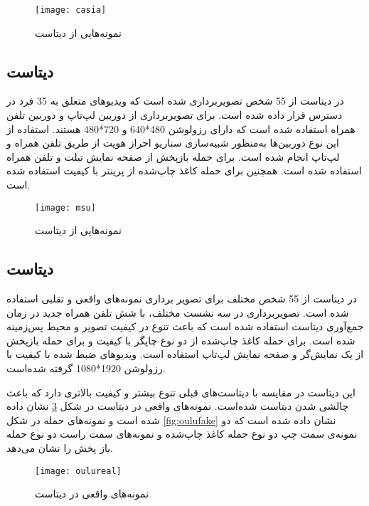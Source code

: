  \begin{figure}[h]
	\centerline{\texttt{[image: casia]}}
	\caption{نمونه‌هایی از دیتاست  \cite{zhang2012face} }
	\label{fig:casia}
\end{figure}

\subsection{دیتاست }
در دیتاست 
\cite{wen2015face}
 از 55 شخص تصویربرداری شده است که ویدیوهای متعلق به 35 فرد در دسترس قرار داده شده است. برای تصویربرداری از دوربین لپ‌تاپ و دوربین تلفن همراه استفاده شده است که دارای رزولوشن 480*640 و 720*480 هستند. استفاده از این نوع دوربین‌ها به‌منظور شبیه‌سازی سناریو احراز هویت از طریق تلفن همراه و لپ‌تاپ انجام شده است. برای حمله باز‌پخش از صفحه نمایش تبلت و تلفن همراه استفاده شده است. همچنین برای حمله کاغذ چاپ‌شده از پرینتر با کیفیت استفاده شده است.

 \begin{figure}[h]
	\centerline{\texttt{[image: msu]}}
	\caption{نمونه‌هایی از دیتاست  \cite{wen2015face} }
	\label{fig:msu}
\end{figure}

\subsection{دیتاست }
در دیتاست 
\cite{boulkenafet2017oulu}
از 55 شخص مختلف برای تصویر برداری نمونه‌های واقعی و تقلبی استفاده شده است. تصویربرداری در سه نشست مختلف، با شش تلفن همراه جدید در زمان جمع‌آوری دیتاست استفاده شده است که باعث تنوع در کیفیت تصویر و محیط پس‌زمینه شده است. برای حمله کاغذ چاپ‌شده از دو نوع چاپگر با کیفیت و برای حمله بازپخش از یک نمایش‌گر و صفحه نمایش لپ‌تاپ استفاده است. ویدیوهای ضبط شده با کیفیت  با رزولوشن 1920*1080 گرفته شده‌است.

این دیتاست در مقایسه با دیتاست‌های قبلی تنوع بیشتر و کیفیت بالاتری دارد که باعث چالشی شدن دیتاست شده‌است. نمونه‌های واقعی در دیتاست  در شکل 
\ref{fig:oulureal}
 نشان داده شده است و نمونه‌های حمله در شکل 
 \ref{fig:oulufake}
 نشان داده شده است که دو نمونه‌ی سمت چپ دو نوع حمله کاغذ چاپ‌شده و نمونه‌های سمت راست دو نوع حمله باز پخش را نشان می‌دهد. 
 
  \begin{figure}[h]
 	\centerline{\texttt{[image: oulureal]}}
 	\caption{نمونه‌های واقعی در دیتاست  \cite{boulkenafet2017oulu} }
 	\label{fig:oulureal}
 \end{figure}
 
